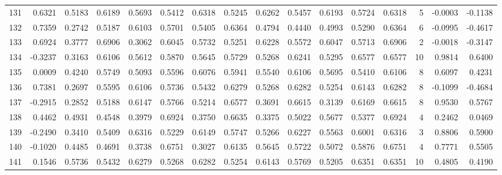 \begin{tabular}{lrrrrrrrrrrrrrrr}
131 &      0.6321 &  0.5183 &  0.6189 &  0.5693 &  0.5412 &  0.6318 &  0.5245 &  0.6262 &  0.5457 &  0.6193 &   0.5724 &     0.6318 &      5 &                   -0.0003 &                    -0.1138 \\
132 &      0.7359 &  0.2742 &  0.5187 &  0.6103 &  0.5701 &  0.5405 &  0.6364 &  0.4794 &  0.4440 &  0.4993 &   0.5290 &     0.6364 &      6 &                   -0.0995 &                    -0.4617 \\
133 &      0.6924 &  0.3777 &  0.6906 &  0.3062 &  0.6045 &  0.5732 &  0.5251 &  0.6228 &  0.5572 &  0.6047 &   0.5713 &     0.6906 &      2 &                   -0.0018 &                    -0.3147 \\
134 &     -0.3237 &  0.3163 &  0.6106 &  0.5612 &  0.5870 &  0.5645 &  0.5729 &  0.5268 &  0.6241 &  0.5295 &   0.6577 &     0.6577 &     10 &                    0.9814 &                     0.6400 \\
135 &      0.0009 &  0.4240 &  0.5749 &  0.5093 &  0.5596 &  0.6076 &  0.5941 &  0.5540 &  0.6106 &  0.5695 &   0.5410 &     0.6106 &      8 &                    0.6097 &                     0.4231 \\
136 &      0.7381 &  0.2697 &  0.5595 &  0.6106 &  0.5736 &  0.5432 &  0.6279 &  0.5268 &  0.6282 &  0.5254 &   0.6143 &     0.6282 &      8 &                   -0.1099 &                    -0.4684 \\
137 &     -0.2915 &  0.2852 &  0.5188 &  0.6147 &  0.5766 &  0.5214 &  0.6577 &  0.3691 &  0.6615 &  0.3139 &   0.6169 &     0.6615 &      8 &                    0.9530 &                     0.5767 \\
138 &      0.4462 &  0.4931 &  0.4548 &  0.3979 &  0.6924 &  0.3750 &  0.6635 &  0.3375 &  0.5022 &  0.5677 &   0.5377 &     0.6924 &      4 &                    0.2462 &                     0.0469 \\
139 &     -0.2490 &  0.3410 &  0.5409 &  0.6316 &  0.5229 &  0.6149 &  0.5747 &  0.5266 &  0.6227 &  0.5563 &   0.6001 &     0.6316 &      3 &                    0.8806 &                     0.5900 \\
140 &     -0.1020 &  0.4485 &  0.4691 &  0.3738 &  0.6751 &  0.3027 &  0.6135 &  0.5645 &  0.5722 &  0.5072 &   0.5876 &     0.6751 &      4 &                    0.7771 &                     0.5505 \\
141 &      0.1546 &  0.5736 &  0.5432 &  0.6279 &  0.5268 &  0.6282 &  0.5254 &  0.6143 &  0.5769 &  0.5205 &   0.6351 &     0.6351 &     10 &                    0.4805 &                     0.4190 \\

\end{tabular}
